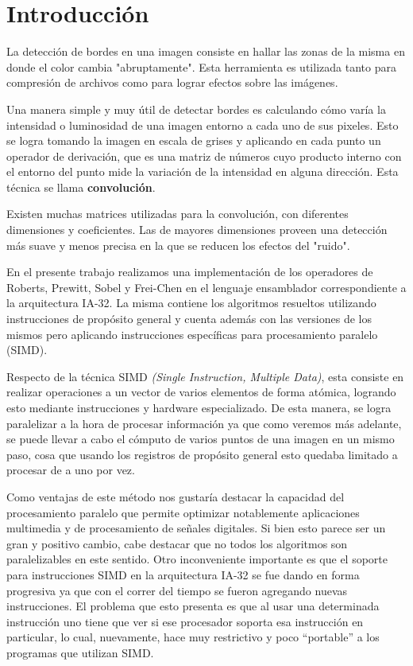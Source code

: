 \section{Introducción}

La detección de bordes en una imagen consiste en hallar las zonas de la misma en donde el color cambia "abruptamente". Esta herramienta es utilizada tanto para compresión de archivos como para lograr efectos sobre las imágenes.


Una manera simple y muy útil de detectar bordes es calculando cómo varía la intensidad o luminosidad de una imagen entorno a cada uno de sus pixeles. Esto se logra tomando la imagen en escala de grises y aplicando en cada punto un operador de derivación, que es una matriz de números cuyo producto interno con el entorno del punto mide la variación de la intensidad en alguna dirección. Esta técnica se llama \textbf{convolución}.

Existen muchas matrices utilizadas para la convolución, con diferentes dimensiones y coeficientes. Las de mayores dimensiones proveen una detección más suave y menos precisa en la que se reducen los efectos del "ruido".

En el presente trabajo realizamos una implementación de los operadores de Roberts, Prewitt, Sobel y Frei-Chen en el lenguaje ensamblador correspondiente a la arquitectura IA-32. La misma contiene los algoritmos resueltos utilizando instrucciones de propósito general y cuenta además con las versiones de los mismos pero aplicando instrucciones específicas para procesamiento paralelo (SIMD).

Respecto de la técnica SIMD \emph{(Single Instruction, Multiple Data)}, esta consiste en realizar operaciones a un vector de varios elementos de forma atómica, logrando esto mediante instrucciones y hardware especializado. De esta manera, se logra paralelizar a la hora de procesar información ya que como veremos más adelante, se puede llevar a cabo el cómputo de varios puntos de una imagen en un mismo paso, cosa que usando los registros de propósito general esto quedaba limitado a procesar de a uno por vez. 

Como ventajas de este método nos gustaría destacar la capacidad del procesamiento paralelo que permite optimizar notablemente aplicaciones multimedia y de procesamiento de señales digitales. Si bien esto parece ser un gran y positivo cambio, cabe destacar que no todos los algoritmos son paralelizables en este sentido. Otro inconveniente importante es que el soporte para instrucciones SIMD en la arquitectura IA-32 se fue dando en forma progresiva ya que con el correr del tiempo se fueron agregando nuevas instrucciones. El problema que esto presenta es que al usar una determinada instrucción uno tiene que ver si ese procesador soporta esa instrucción en particular, lo cual, nuevamente, hace muy restrictivo y poco ``portable'' a los programas que utilizan SIMD.

